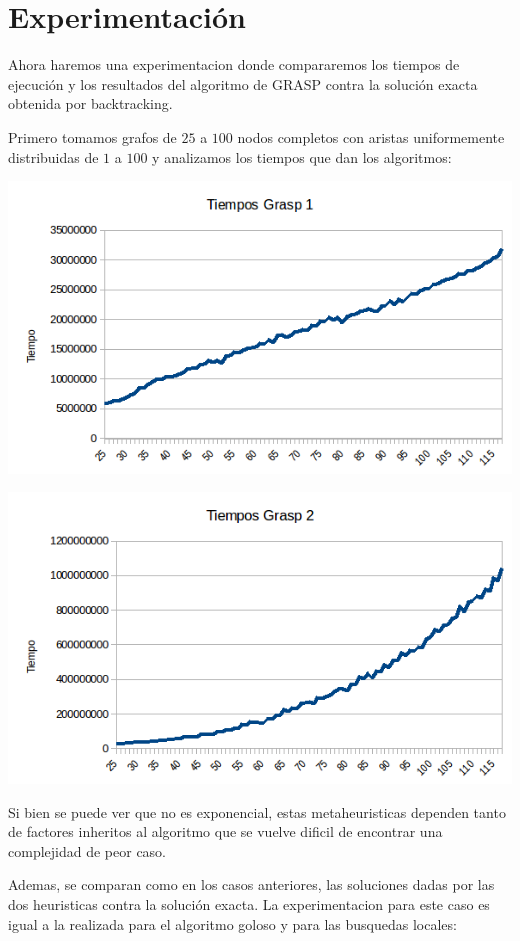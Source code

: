 \section{Experimentación}

Ahora haremos una experimentacion donde compararemos los tiempos de ejecución y los resultados del algoritmo de GRASP contra la solución exacta obtenida por backtracking.

Primero tomamos grafos de $25$ a $100$ nodos completos con aristas uniformemente distribuidas de $1$ a $100$ y analizamos los tiempos que dan los algoritmos:

\includegraphics[scale=0.5]{Ej5/tiempog1.png}

\includegraphics[scale=0.5]{Ej5/tiempog2.png}

Si bien se puede ver que no es exponencial, estas metaheuristicas dependen tanto de factores inheritos al algoritmo que se vuelve dificil de encontrar una complejidad de peor caso.

Ademas, se comparan como en los casos anteriores, las soluciones dadas por las dos heuristicas contra la solución exacta. La experimentacion para este caso es igual a la realizada para el algoritmo goloso y para las busquedas locales:

